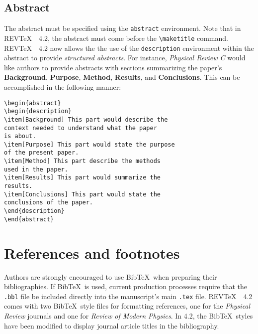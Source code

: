\documentclass[twocolumn,secnumarabic,amssymb, nobibnotes, aps, prd]{revtex4-2}
\newcommand{\revtex}{REV\TeX\ }
\newcommand{\macro}[1]{\texttt{\textbackslash#1}}
\newcommand{\m}[1]{\macro{#1}}
\newcommand{\env}[1]{\texttt{#1}}
\begin{document}
\subsection{Abstract}
The abstract must be specified using the \env{abstract}
environment. Note that in \revtex\ 4.2, the abstract must come before
the \m{maketitle} command. \revtex\ 4.2 now allows the the use of the \env{description}
environment within the abstract to provide \textit{structured abstracts}. For instance, \textit{Physical Review C} would like authors to provide abstracts with sections summarizing the paper's  \textbf{Background}, \textbf{Purpose}, \textbf{Method}, \textbf{Results}, and \textbf{Conclusions}. This can be accomplished in the following manner:
\begin{verbatim}
\begin{abstract}
\begin{description}
\item[Background] This part would describe the
context needed to understand what the paper
is about.
\item[Purpose] This part would state the purpose
of the present paper.
\item[Method] This part describe the methods
used in the paper.
\item[Results] This part would summarize the
results.
\item[Conclusions] This part would state the
conclusions of the paper.
\end{description}
\end{abstract}
\end{verbatim}

\section{References and footnotes}
Authors are strongly encouraged
to use Bib\TeX\ when preparing their bibliographies.  If Bib\TeX\ is used, current production processes
require that the \texttt{.bbl} file be included directly into the
manuscript's main \texttt{.tex} file. \revtex\ 4.2 comes with two Bib\TeX\ style files for formatting
references, one for the \textit{Physical Review} journals and one 
for \textit{Review of Modern Physics}. In 4.2, the Bib\TeX\ styles have been modified to display journal article titles in the bibliography.
\end{document}
